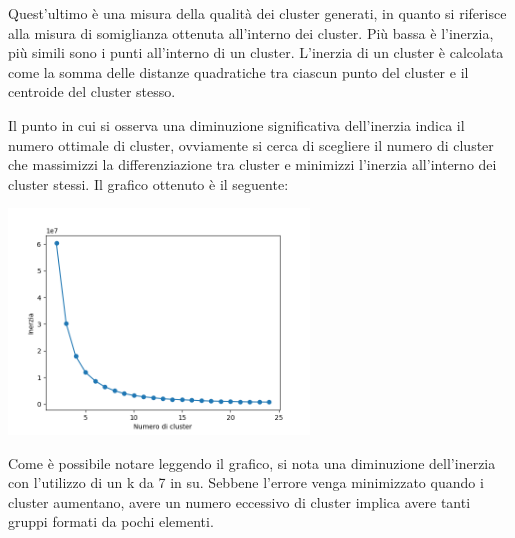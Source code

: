\documentclass[a4paper, 10pt]{report}
\begin{document}
                Quest'ultimo è una misura della qualità dei cluster generati, in quanto si riferisce alla misura di somiglianza ottenuta
                all'interno dei cluster.
                Più bassa è l'inerzia, più simili sono i punti all'interno di un cluster.
                L'inerzia di un cluster è calcolata come la somma delle distanze quadratiche tra ciascun punto del cluster e il
                centroide del cluster stesso.

                Il punto in cui si osserva una diminuzione significativa dell'inerzia indica il numero ottimale di cluster, ovviamente
                si cerca di scegliere il numero di cluster che massimizzi la differenziazione tra cluster e
                minimizzi l'inerzia all'interno dei cluster stessi. Il grafico ottenuto è il seguente:

                \begin{center}
                    \includegraphics[width=8cm]{evaluation/elbowPoint}\\
                \end{center}

                Come è possibile notare leggendo il grafico, si nota una diminuzione dell'inerzia con l'utilizzo di un k da 7 in su.
                Sebbene l’errore venga minimizzato quando i cluster aumentano, avere un numero eccessivo di cluster implica avere tanti gruppi
                formati da pochi elementi.
\end{document}
